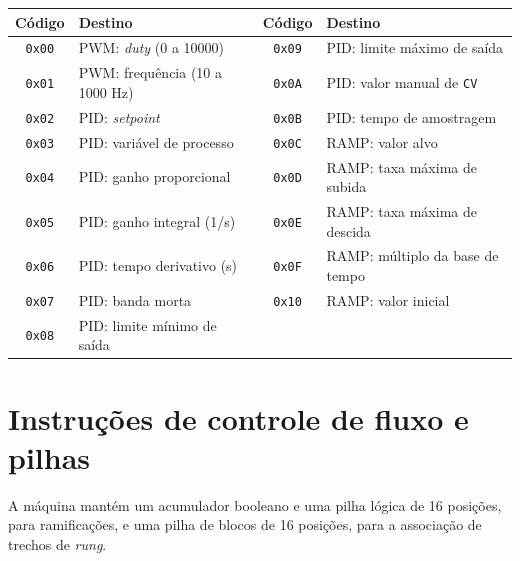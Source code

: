 \begin{quadrofixo}
    \centering
    \begin{tabular}{|c|p{5.5cm}|c|p{5.5cm}|}
        \hline
        Código & Destino & Código & Destino \\
        \hline
        \texttt{0x00} & PWM: \textit{duty} (0 a 10000) & \texttt{0x09} & PID: limite máximo de saída \\
        \hline
        \texttt{0x01} & PWM: frequência (10 a 1000 Hz) & \texttt{0x0A} & PID: valor manual de \texttt{CV} \\
        \hline
        \texttt{0x02} & PID: \textit{setpoint} & \texttt{0x0B} & PID: tempo de amostragem \\
        \hline
        \texttt{0x03} & PID: variável de processo & \texttt{0x0C} & RAMP: valor alvo \\
        \hline
        \texttt{0x04} & PID: ganho proporcional & \texttt{0x0D} & RAMP: taxa máxima de subida \\
        \hline
        \texttt{0x05} & PID: ganho integral (1/s) & \texttt{0x0E} & RAMP: taxa máxima de descida \\
        \hline
        \texttt{0x06} & PID: tempo derivativo (s) & \texttt{0x0F} & RAMP: múltiplo da base de tempo \\
        \hline
        \texttt{0x07} & PID: banda morta & \texttt{0x10} & RAMP: valor inicial \\
        \hline
        \texttt{0x08} & PID: limite mínimo de saída & & \\
        \hline
    \end{tabular}

    \label{qua:ape-stw}
\end{quadrofixo}

\section{Instruções de controle de fluxo e pilhas}
\label{sec:ape-isa-fluxo}

A máquina mantém um acumulador booleano e uma pilha lógica de 16 posições, para ramificações, e uma pilha de blocos de 16 posições, para a associação de trechos de \textit{rung}.


